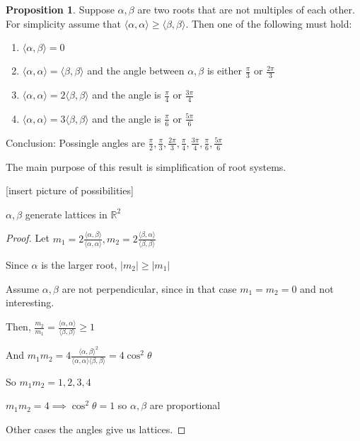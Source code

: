 \documentclass{article}
\theoremstyle{definition}
\newtheorem{proposition}{Proposition}
\begin{document}
\begin{proposition}
    Suppose \(\alpha ,\beta \) are two roots that are not multiples of each other. For simplicity assume that \(\langle \alpha ,\alpha  \rangle \geq \langle \beta ,\beta  \rangle \). Then one of the following must hold:
    
    \begin{enumerate}
        \item \(\langle \alpha ,\beta  \rangle = 0\) 
        \item \(\langle \alpha ,\alpha  \rangle = \langle \beta ,\beta  \rangle \) and the angle between \(\alpha ,\beta \) is either \(\frac{\pi}{3}\) or \(\frac{2\pi}{3}\) 
        \item \(\langle \alpha ,\alpha  \rangle = 2\langle \beta ,\beta  \rangle \) and the angle is \(\frac{\pi}{4}\) or \(\frac{3\pi}{4}\) 
        \item \(\langle \alpha ,\alpha  \rangle = 3 \langle \beta ,\beta  \rangle \) and the angle is \(\frac{\pi}{6}\) or \(\frac{5\pi}{6}\) 
    \end{enumerate}

    Conclusion: Possingle angles are \(\frac{\pi}{2}, \frac{\pi}{3}, \frac{2\pi}{3}, \frac{\pi}{4}, \frac{3\pi}{4},\frac{\pi}{6},\frac{5\pi}{6}\) 

\end{proposition}

The main purpose of this result is simplification of root systems.

[insert picture of possibilities]

\(\alpha ,\beta \) generate lattices in \(\mathbb{R}^2\)

\begin{proof}
    Let \(m_1 = 2 \frac{\langle \alpha , \beta  \rangle }{\langle \alpha ,\alpha  \rangle }, m_2 = 2 \frac{\langle \beta ,\alpha  \rangle}{\langle \beta,\beta  \rangle }\) 

    Since \(\alpha \) is the larger root, \(\vert m_2 \vert \geq \vert m_1 \vert\) 

    Assume \(\alpha ,\beta \) are not perpendicular, since in that case \(m_1=m_2=0\) and not interesting.

    Then, \(\frac{m_2}{m_1}= \frac{\langle \alpha ,\alpha  \rangle }{\langle \beta ,\beta  \rangle } \geq 1 \) 

    And \(m_1 m_2 = 4 \frac{\langle \alpha ,\beta \rangle^2 }{\langle \alpha ,\alpha  \rangle \langle \beta ,\beta  \rangle }=4\cos^2 \theta\) 

    So \(m_1 m_2 = 1,2,3,4\)
    
    \(m_1 m_2=4 \implies \cos ^2\theta = 1\) so \(\alpha ,\beta \) are proportional

    Other cases the angles give us lattices.

\end{proof}
\end{document}
